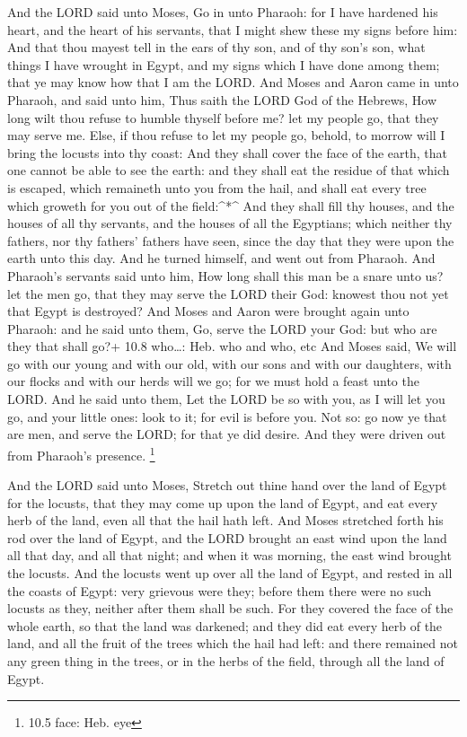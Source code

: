  And the LORD said unto Moses, Go in unto Pharaoh: for I
have hardened his heart, and the heart of his servants, that I might
shew these my signs before him:  And that thou mayest tell
in the ears of thy son, and of thy son's son, what things I have wrought
in Egypt, and my signs which I have done among them; that ye may know
how that I am the LORD.  And Moses and Aaron came in unto
Pharaoh, and said unto him, Thus saith the LORD God of the Hebrews, How
long wilt thou refuse to humble thyself before me? let my people go,
that they may serve me.  Else, if thou refuse to let my
people go, behold, to morrow will I bring the locusts into thy coast:
 And they shall cover the face of the earth, that one cannot
be able to see the earth: and they shall eat the residue of that which
is escaped, which remaineth unto you from the hail, and shall eat every
tree which groweth for you out of the field:\^{}*\^{}  And
they shall fill thy houses, and the houses of all thy servants, and the
houses of all the Egyptians; which neither thy fathers, nor thy fathers'
fathers have seen, since the day that they were upon the earth unto this
day. And he turned himself, and went out from Pharaoh.  And
Pharaoh's servants said unto him, How long shall this man be a snare
unto us? let the men go, that they may serve the LORD their God: knowest
thou not yet that Egypt is destroyed?  And Moses and Aaron
were brought again unto Pharaoh: and he said unto them, Go, serve the
LORD your God: but who are they that shall go?+ 10.8 who\ldots: Heb. who
and who, etc  And Moses said, We will go with our young and
with our old, with our sons and with our daughters, with our flocks and
with our herds will we go; for we must hold a feast unto the LORD.
 And he said unto them, Let the LORD be so with you, as I
will let you go, and your little ones: look to it; for evil is before
you.  Not so: go now ye that are men, and serve the LORD;
for that ye did desire. And they were driven out from Pharaoh's
presence. \footnote{10.5 face: Heb. eye}

 And the LORD said unto Moses, Stretch out thine hand over
the land of Egypt for the locusts, that they may come up upon the land
of Egypt, and eat every herb of the land, even all that the hail hath
left.  And Moses stretched forth his rod over the land of
Egypt, and the LORD brought an east wind upon the land all that day, and
all that night; and when it was morning, the east wind brought the
locusts.  And the locusts went up over all the land of
Egypt, and rested in all the coasts of Egypt: very grievous were they;
before them there were no such locusts as they, neither after them shall
be such.  For they covered the face of the whole earth, so
that the land was darkened; and they did eat every herb of the land, and
all the fruit of the trees which the hail had left: and there remained
not any green thing in the trees, or in the herbs of the field, through
all the land of Egypt.

